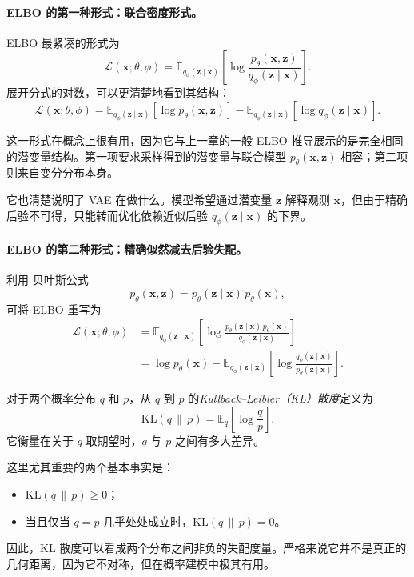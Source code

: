\paragraph{ELBO 的第一种形式：联合密度形式。}
ELBO 最紧凑的形式为
\[
\mathcal{L}(\mathbf{x};\theta,\phi)
=
\mathbb{E}_{q_{\phi}(\mathbf{z}\mid\mathbf{x})}
\!\left[
\log\frac{p_{\theta}(\mathbf{x},\mathbf{z})}
{q_{\phi}(\mathbf{z}\mid\mathbf{x})}
\right].
\]
展开分式的对数，可以更清楚地看到其结构：
\[
\mathcal{L}(\mathbf{x};\theta,\phi)
=
\mathbb{E}_{q_{\phi}(\mathbf{z}\mid\mathbf{x})}
[\log p_{\theta}(\mathbf{x},\mathbf{z})]
-
\mathbb{E}_{q_{\phi}(\mathbf{z}\mid\mathbf{x})}
[\log q_{\phi}(\mathbf{z}\mid\mathbf{x})].
\]

这一形式在概念上很有用，因为它与上一章的一般 ELBO 推导展示的是完全相同的潜变量结构。第一项要求采样得到的潜变量与联合模型 \(p_{\theta}(\mathbf{x},\mathbf{z})\) 相容；第二项则来自变分分布本身。

它也清楚说明了 VAE 在做什么。模型希望通过潜变量 \(\mathbf{z}\) 解释观测 \(\mathbf{x}\)，但由于精确后验不可得，只能转而优化依赖近似后验 \(q_{\phi}(\mathbf{z}\mid\mathbf{x})\) 的下界。

\paragraph{ELBO 的第二种形式：精确似然减去后验失配。}

利用 贝叶斯公式
\[
p_{\theta}(\mathbf{x},\mathbf{z})
=
p_{\theta}(\mathbf{z}\mid\mathbf{x})\,p_{\theta}(\mathbf{x}),
\]
可将 ELBO 重写为
\[
\begin{aligned}
\mathcal{L}(\mathbf{x};\theta,\phi)
&=
\mathbb{E}_{q_{\phi}(\mathbf{z}\mid\mathbf{x})}
\!\left[
\log\frac{p_{\theta}(\mathbf{z}\mid\mathbf{x})\,p_{\theta}(\mathbf{x})}
{q_{\phi}(\mathbf{z}\mid\mathbf{x})}
\right] \\[4pt]
&=
\log p_{\theta}(\mathbf{x})
-
\mathbb{E}_{q_{\phi}(\mathbf{z}\mid\mathbf{x})}
\!\left[
\log\frac{q_{\phi}(\mathbf{z}\mid\mathbf{x})}
{p_{\theta}(\mathbf{z}\mid\mathbf{x})}
\right].
\end{aligned}
\]

\begin{tcolorbox}[
  colback=blue!6,
  colframe=blue!55!black,
  title={KL 散度},
  boxrule=0.8pt,
  arc=2mm,
  left=2mm,
  right=2mm,
  top=1mm,
  bottom=1mm
]
对于两个概率分布 \(q\) 和 \(p\)，从 \(q\) 到 \(p\) 的\emph{Kullback--Leibler（KL）散度}定义为
\[
\mathrm{KL}(q\,\|\,p)
=
\mathbb{E}_{q}\!\left[\log\frac{q}{p}\right].
\]
它衡量在关于 \(q\) 取期望时，\(q\) 与 \(p\) 之间有多大差异。

这里尤其重要的两个基本事实是：
\begin{itemize}
    \item \(\mathrm{KL}(q\,\|\,p)\ge0\)；
    \item 当且仅当 \(q=p\) 几乎处处成立时，\(\mathrm{KL}(q\,\|\,p)=0\)。
\end{itemize}

因此，KL 散度可以看成两个分布之间非负的失配度量。严格来说它并不是真正的几何距离，因为它不对称，但在概率建模中极其有用。
\end{tcolorbox}

